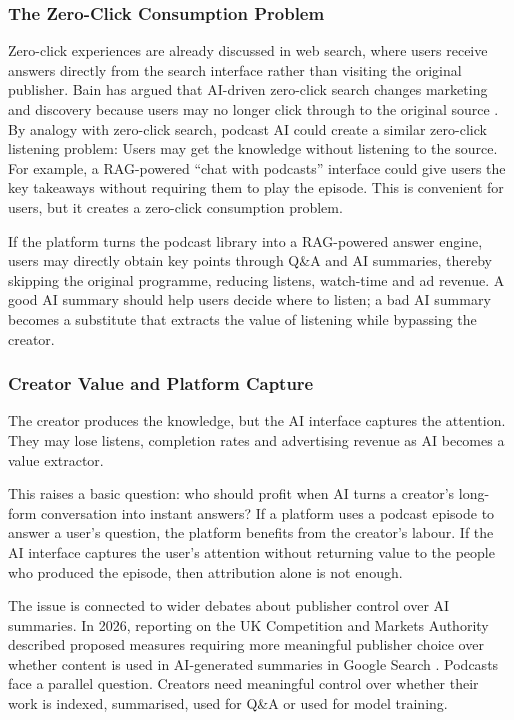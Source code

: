 \documentclass[11pt,a4paper]{article}
\begin{document}
\subsubsection{The Zero-Click Consumption Problem}
Zero-click experiences are already discussed in web search, where users receive answers directly from the search interface rather than visiting the original publisher. Bain has argued that AI-driven zero-click search changes marketing and discovery because users may no longer click through to the original source \cite{Bain2025ZeroClick}. By analogy with zero-click search, podcast AI could create a similar zero-click listening problem: Users may get the knowledge without listening to the source. For example, a RAG-powered ``chat with podcasts'' interface could give users the key takeaways without requiring them to play the episode. This is convenient for users, but it creates a zero-click consumption problem.

If the platform turns the podcast library into a RAG-powered answer engine, users may directly obtain key points through Q\&A and AI summaries, thereby skipping the original programme, reducing listens, watch-time and ad revenue. A good AI summary should help users decide where to listen; a bad AI summary becomes a substitute that extracts the value of listening while bypassing the creator.

\subsubsection{Creator Value and Platform Capture}

The creator produces the knowledge, but the AI interface captures the attention. They may lose listens, completion rates and advertising revenue as AI becomes a value extractor.

This raises a basic question: who should profit when AI turns a creator's long-form conversation into instant answers? If a platform uses a podcast episode to answer a user's question, the platform benefits from the creator's labour. If the AI interface captures the user's attention without returning value to the people who produced the episode, then attribution alone is not enough.

The issue is connected to wider debates about publisher control over AI summaries. In 2026, reporting on the UK Competition and Markets Authority described proposed measures requiring more meaningful publisher choice over whether content is used in AI-generated summaries in Google Search \cite{AP2026CMA}. Podcasts face a parallel question. Creators need meaningful control over whether their work is indexed, summarised, used for Q\&A or used for model training.
\end{document}
